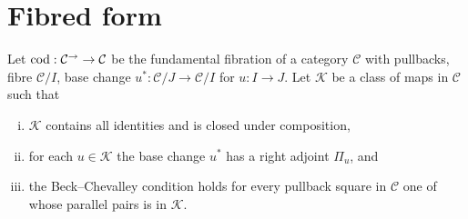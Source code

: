 \documentclass{article}
\begin{document}
\section*{Fibred form}
Let $\rm{cod} : \mathcal{C}^{\to} \to \mathcal{C}$ be the fundamental fibration of a category $\mathcal{C}$ with pullbacks, fibre $\mathcal{C}/I$, base change $u^* : \mathcal{C}/J \to \mathcal{C}/I$ for $u : I \to J$. Let $\mathcal{K}$ be a class of maps in $\mathcal{C}$ such that 
\begin{enumerate}[(i)]
    \item $\mathcal{K}$ contains all identities and is closed under composition,
    \item for each $u \in \mathcal{K}$ the base change $u^*$ has a right adjoint $\Pi_u$, and
    \item the Beck--Chevalley condition holds for every pullback square in $\mathcal{C}$ one of whose parallel pairs is in $\mathcal{K}$.
\end{enumerate}
\end{document}

